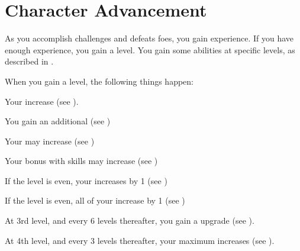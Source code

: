 \section{Character Advancement}\label{Character Advancement}

    As you accomplish challenges and defeats foes, you gain experience.
    If you have enough experience, you gain a level.
    You gain some abilities at specific levels, as described in .

    When you gain a level, the following things happen:
    \begin{raggeditemize}
        \item Your  increase (see ).
        \item You gain an additional  (see )
        \item Your  may increase (see )
        \item Your bonus with  skills may increase (see )
        \item If the level is even, your  increases by 1 (see )
        \item If the level is even, all of your  increase by 1 (see )
        \item At 3rd level, and every 6 levels thereafter, you gain a  upgrade (see ).
        \item At 4th level, and every 3 levels thereafter, your maximum  increases (see ).
    \end{raggeditemize}

